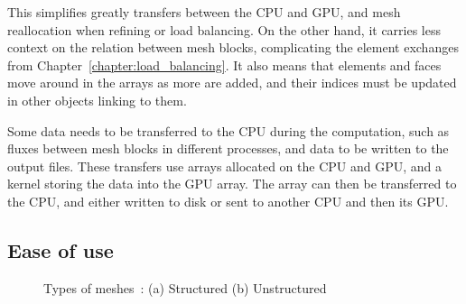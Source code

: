 This simplifies greatly transfers between the CPU and GPU, and mesh reallocation when refining or
load balancing. On the other hand, it carries less context on the relation between mesh blocks,
complicating the element exchanges from Chapter~\ref{chapter:load_balancing}. It also means that
elements and faces move around in the arrays as more are added, and their indices must be updated in
other objects linking to them. 

Some data needs to be transferred to the CPU during the computation, such as fluxes between mesh
blocks in different processes, and data to be written to the output files. These transfers use
arrays allocated on the CPU and GPU, and a kernel storing the data into the GPU array. The array can
then be transferred to the CPU, and either written to disk or sent to another CPU and then its GPU.

\subsection{Ease of use} \label{subsection:graphics_processing_units:data_structure:ease_of_use}

\begin{figure}[H]
	\centering
	\hfill
	\caption{Types of meshes~\cite{Clucas1999}: (a) Structured (b) Unstructured}
	\label{fig:mesh_types}
\end{figure}

